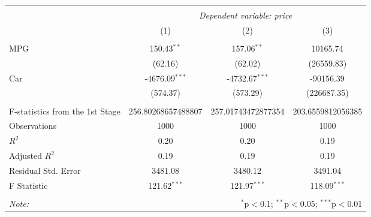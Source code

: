 
\begin{tabular}{@{\extracolsep{5pt}}lccc}
\\[-1.8ex]\hline
\hline \\[-1.8ex]
& \multicolumn{3}{c}{\textit{Dependent variable: price}} \
\cr \cline{2-4}
\\[-1.8ex] & (1) & (2) & (3) \\
\hline \\[-1.8ex]
 MPG & 150.43$^{**}$ & 157.06$^{**}$ & 10165.74$^{}$ \\
& (62.16) & (62.02) & (26559.83) \\
 Car & -4676.09$^{***}$ & -4732.67$^{***}$ & -90156.39$^{}$ \\
& (574.37) & (573.29) & (226687.35) \\
\hline \\[-1.8ex]
 F-statistics from the 1st Stage & 256.80268657488807 & 257.01743472877354 & 203.6559812056385 \\
 Observations & 1000 & 1000 & 1000 \\
 $R^2$ & 0.20 & 0.20 & 0.19 \\
 Adjusted $R^2$ & 0.19 & 0.19 & 0.19 \\
 Residual Std. Error & 3481.08 & 3480.12 & 3491.04 \\
 F Statistic & 121.62$^{***}$ & 121.97$^{***}$ & 118.09$^{***}$ \\
\hline
\hline \\[-1.8ex]
\textit{Note:} & \multicolumn{3}{r}{$^{*}$p$<$0.1; $^{**}$p$<$0.05; $^{***}$p$<$0.01} \\
\end{tabular}
